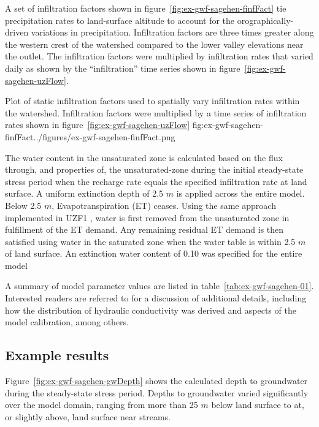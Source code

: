 A set of infiltration factors shown in figure~\ref{fig:ex-gwf-sagehen-finfFact} tie precipitation rates to land-surface altitude to account for the orographically-driven variations in precipitation.  Infiltration factors are three times greater along the western crest of the watershed compared to the lower valley elevations near the outlet.  The infiltration factors were multiplied by infiltration rates that varied daily as shown by the ``infiltration'' time series shown in figure~\ref{fig:ex-gwf-sagehen-uzFlow}.  

\begin{StandardFigure}
	{Plot of static infiltration factors used to spatially vary infiltration rates within the watershed. Infiltration factors were multiplied by a time series of infiltration rates shown in figure~\ref{fig:ex-gwf-sagehen-uzFlow}}
	{fig:ex-gwf-sagehen-finfFact}{../figures/ex-gwf-sagehen-finfFact.png}
\end{StandardFigure}

The water content in the unsaturated zone is calculated based on the flux through, and properties of, the unsaturated-zone during the initial steady-state stress period when the recharge rate equals the specified infiltration rate at land surface.  A uniform extinction depth of 2.5 $m$ is applied across the entire model.  Below 2.5 $m$, Evapotranspiration (ET) ceases.  Using the same approach implemented in UZF1 \citep{UZF}, water is first removed from the unsaturated zone in fulfillment of the ET demand.  Any remaining residual ET demand is then  satisfied using water in the saturated zone when the water table is within 2.5 $m$ of land surface.  An extinction water content of 0.10 was specified for the entire model

A summary of model parameter values are listed in table~\ref{tab:ex-gwf-sagehen-01}. Interested readers are referred to \cite{UZF} for a discussion of additional details, including how the distribution of hydraulic conductivity was derived and aspects of the model calibration, among others.



\subsection{Example results}

Figure~\ref{fig:ex-gwf-sagehen-gwDepth} shows the calculated depth to groundwater during the steady-state stress period.  Depths to groundwater varied significantly over the model domain, ranging from more than 25 $m$ below land surface to at, or slightly above, land surface near streams.

